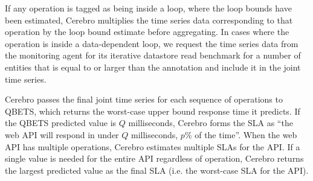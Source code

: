 If any operation is tagged as being inside a loop, where the loop
bounds have been estimated, Cerebro multiplies
the time series data corresponding to that 
operation by the loop bound estimate before aggregating. In cases where the operation 
is inside a data-dependent loop, we request the time series data from 
the monitoring agent for its iterative datastore read benchmark 
for a number of entities that is equal to or larger than the annotation
and include it in the joint time series.

Cerebro passes the final joint
time series for each sequence of operations to QBETS, 
which returns the worst-case upper bound response time it predicts.
If the QBETS predicted value is $Q$ milliseconds, 
Cerebro forms the SLA as ``the web API will respond in
under $Q$ milliseconds, $p$\% of the time''. 
When the web API has multiple operations, Cerebro estimates multiple 
SLAs for the API. 
If a single value is needed for the entire API regardless of operation,
Cerebro returns the largest 
predicted value as the final SLA (i.e. the worst-case SLA for the API).



